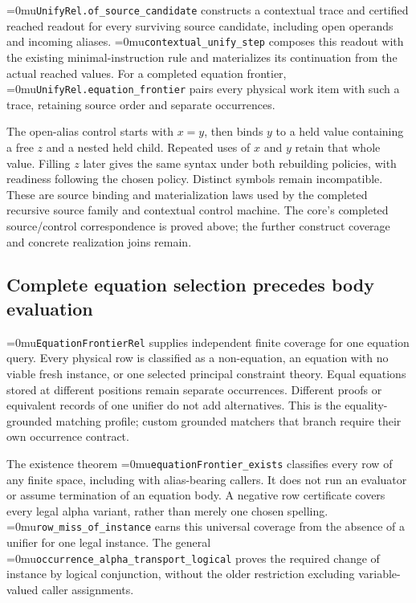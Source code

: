 \documentclass[11pt,a4paper]{article}
\newcommand{\name}[1]{\textup{\Urlmuskip=0mu\relax\nolinkurl{#1}}}
\begin{document}
\name{UnifyRel.of_source_candidate} constructs a contextual trace and
certified reached readout for every surviving source candidate, including
open operands and incoming aliases. \name{contextual_unify_step} composes
this readout with the existing minimal-instruction rule and materializes its
continuation from the actual reached values. For a completed equation
frontier, \name{UnifyRel.equation_frontier} pairs every physical work item
with such a trace, retaining source order and separate occurrences.

The open-alias control starts with $x=y$, then binds $y$ to a held value
containing a free $z$ and a nested held child. Repeated uses of $x$ and $y$
retain that whole value. Filling $z$ later gives the same syntax under both
rebuilding policies, with readiness following the chosen policy. Distinct
symbols remain incompatible. These are source binding and materialization
laws used by the completed recursive source family and contextual control
machine. The core's completed source/control correspondence is proved above;
the further construct coverage and concrete realization joins remain.

\subsection*{Complete equation selection precedes body evaluation}

\name{EquationFrontierRel} supplies independent finite coverage for one
equation query. Every physical row is classified as a non-equation, an
equation with no viable fresh instance, or one selected principal constraint
theory. Equal equations stored at different positions remain separate
occurrences. Different proofs or equivalent records of one unifier do not
add alternatives. This is the equality-grounded matching profile; custom
grounded matchers that branch require their own occurrence contract.

The existence theorem \name{equationFrontier_exists} classifies every row
of any finite space, including with alias-bearing callers. It does not run
an evaluator or assume termination of an equation body. A negative row
certificate covers every legal alpha variant, rather than merely one
chosen spelling. \name{row_miss_of_instance} earns this universal coverage
from the absence of a unifier for one legal instance. The general
\name{occurrence_alpha_transport_logical} proves the required change of
instance by logical conjunction, without the older restriction excluding
variable-valued caller assignments.
\end{document}
